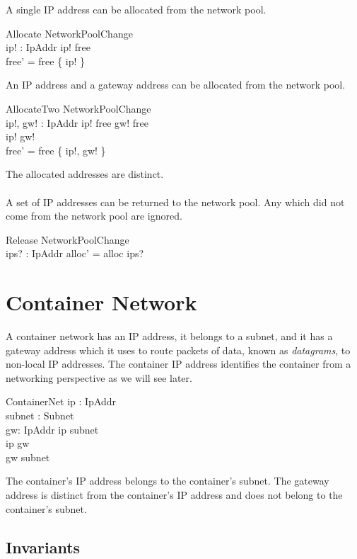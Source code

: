 \documentclass[a4paper,twoside,12pt]{article}
\begin{document}
A single IP address can be allocated from the network pool.
\begin{schema}{Allocate}
NetworkPoolChange \\
ip! : IpAddr
\where
ip! \in free \\
free' = free \setminus \{ ip! \}
\end{schema}

An IP address and a gateway address can be allocated from the network pool.
\begin{schema}{AllocateTwo}
NetworkPoolChange \\
ip!, gw! : IpAddr
\where
ip! \in free \land gw! \in free \\
ip! \neq gw! \\
free' = free \setminus \{ ip!, gw! \}
\end{schema}
The allocated addresses are distinct.
\\ \\
A set of IP addresses can be returned to the network pool. Any which did not come from the
network pool are ignored.
\begin{schema}{Release}
NetworkPoolChange \\
ips? : \power IpAddr
\where
alloc' = alloc \setminus ips?
\end{schema}

\newpage
\section{Container Network}

A container network has an IP address, it belongs to a subnet, and it has a gateway address which it uses to route packets of data, known as \emph{datagrams},  to non-local IP addresses.
The container IP address identifies the container from a networking perspective as we will see later.
\begin{schema}{ContainerNet}
ip : IpAddr \\
subnet : Subnet \\
gw: IpAddr
\where
ip \in subnet \\
ip \neq gw \\
gw \notin subnet
\end{schema}
The container's IP address belongs to the container's subnet. The gateway address is distinct from the container's IP address and does not belong to the container's subnet.

\subsection{Invariants}
\end{document}
